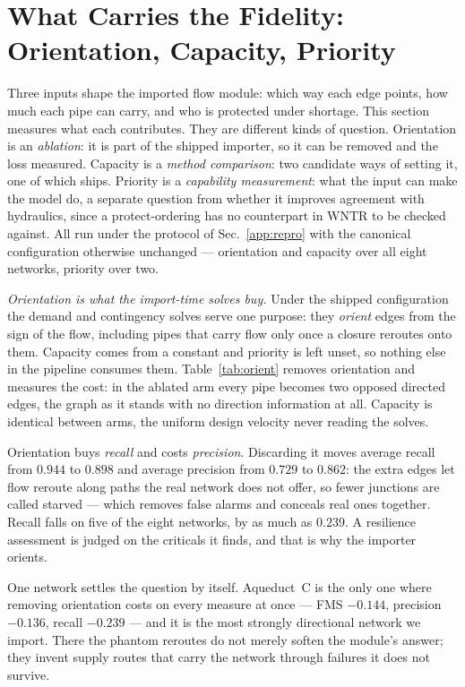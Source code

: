 \documentclass[11pt]{article}
\begin{document}
\section{What Carries the Fidelity: Orientation, Capacity, Priority}\label{app:ablation}

Three inputs shape the imported flow module: which way each edge points, how much each
pipe can carry, and who is protected under shortage. This section measures what each
contributes. They are different kinds of question. Orientation is an \emph{ablation}:
it is part of the shipped importer, so it can be removed and the loss measured.
Capacity is a \emph{method comparison}: two candidate ways of setting it, one of which
ships. Priority is a \emph{capability measurement}: what the input can make the model
do, a separate question from whether it improves agreement with hydraulics, since a
protect-ordering has no counterpart in WNTR to be checked against. All run under the
protocol of Sec.~\ref{app:repro} with the canonical configuration otherwise unchanged
--- orientation and capacity over all eight networks, priority over two.

\emph{Orientation is what the import-time solves buy.} Under the shipped configuration
the demand and contingency solves serve one purpose: they \emph{orient} edges from the
sign of the flow, including pipes that carry flow only once a closure reroutes onto
them. Capacity comes from a constant and priority is left unset, so nothing else in the
pipeline consumes them. Table~\ref{tab:orient} removes orientation and measures the
cost: in the ablated arm every pipe becomes two opposed directed edges, the graph as it
stands with no direction information at all. Capacity is identical between arms, the
uniform design velocity never reading the solves.

Orientation buys \emph{recall} and costs \emph{precision}. Discarding it moves average
recall from $0.944$ to $0.898$ and average precision from $0.729$ to $0.862$: the extra
edges let flow reroute along paths the real network does not offer, so fewer junctions
are called starved --- which removes false alarms and conceals real ones together.
Recall falls on five of the eight networks, by as much as $0.239$. A
resilience assessment is judged on the criticals it finds, and that is why the importer
orients.

One network settles the question by itself. Aqueduct~C is the only one where removing
orientation costs on every measure at once --- FMS $-0.144$, precision $-0.136$, recall
$-0.239$ --- and it is the most strongly directional network we import. There the
phantom reroutes do not merely soften the module's answer; they invent supply routes
that carry the network through failures it does not survive.
\end{document}
